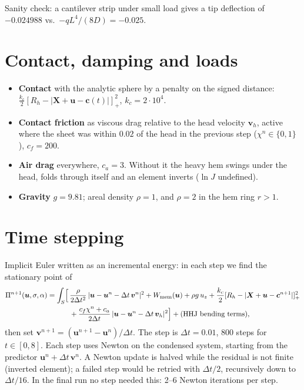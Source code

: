 \documentclass[11pt,a4paper]{article}
\newcommand{\bu}{\boldsymbol u}
\newcommand{\bv}{\boldsymbol v}
\newcommand{\bX}{\boldsymbol X}
\newcommand{\bc}{\boldsymbol c}
\begin{document}
Sanity check: a cantilever strip under small load gives a tip deflection of
$-0.024988$ vs.\ $-qL^4/(8D) = -0.025$.

\section{Contact, damping and loads}
\begin{itemize}
  \item \textbf{Contact} with the analytic sphere by a penalty on the signed distance:
        $\frac{k_c}{2} [R_h - |\bX + \bu - \bc(t)|]_+^2$, $k_c = 2\cdot 10^4$.
  \item \textbf{Contact friction} as viscous drag relative to the head velocity $\bv_h$,
        active where the sheet was within $0.02$ of the head in the previous step
        ($\chi^n \in \{0,1\}$), $c_f = 200$.
  \item \textbf{Air drag} everywhere, $c_a = 3$. Without it the heavy hem swings under the
        head, folds through itself and an element inverts ($\ln J$ undefined).
  \item \textbf{Gravity} $g = 9.81$; areal density $\rho = 1$, and $\rho = 2$ in the hem
        ring $r > 1$.
\end{itemize}

\section{Time stepping}
Implicit Euler written as an incremental energy: in each step we find the stationary point
of
\[
\begin{aligned}
  \Pi^{n+1}(\bu,\sigma,\alpha) = \int_S \Bigl[\, & \frac{\rho}{2\Delta t^2}\,|\bu - \bu^n - \Delta t\, \bv^n|^2
  + W_{\mathrm{mem}}(\bu) + \rho g\, u_z
  + \frac{k_c}{2} [R_h - |\bX + \bu - \bc^{n+1}|]_+^2 \\
  & + \frac{c_f \chi^n + c_a}{2\Delta t}\, |\bu - \bu^n - \Delta t\, \bv_h|^2 \Bigr]
  + \text{(HHJ bending terms)},
\end{aligned}
\]
then set $\bv^{n+1} = (\bu^{n+1} - \bu^n)/\Delta t$. The step is $\Delta t = 0.01$, 800 steps
for $t \in [0, 8]$. Each step uses Newton on the condensed system, starting from the
predictor $\bu^n + \Delta t\,\bv^n$. A Newton update is halved while the residual is not
finite (inverted element); a failed step would be retried with $\Delta t/2$, recursively
down to $\Delta t/16$. In the final run no step needed this: 2--6 Newton iterations
per step.
\end{document}
